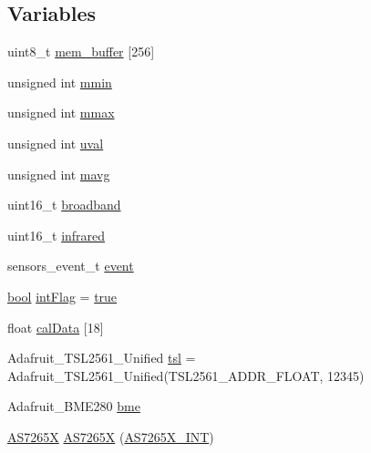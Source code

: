 \subsection*{Variables}
\begin{DoxyCompactItemize}
\item 
uint8\-\_\-t \hyperlink{OWP__DG__SensorStation_8ino_a02235b4e96743403348a58d554caa3dc}{mem\-\_\-buffer} \mbox{[}256\mbox{]}
\item 
unsigned int \hyperlink{OWP__DG__SensorStation_8ino_a46d2773d075382821ba5cc9724036ef6}{mmin}
\item 
unsigned int \hyperlink{OWP__DG__SensorStation_8ino_ac3c625f389082ca7f017934b3508462d}{mmax}
\item 
unsigned int \hyperlink{OWP__DG__SensorStation_8ino_a9d70bb475aa8f1e2306b0aa86b444763}{uval}
\item 
unsigned int \hyperlink{OWP__DG__SensorStation_8ino_ad54903c3e759902a4089ee088aedb4a6}{mavg}
\item 
uint16\-\_\-t \hyperlink{OWP__DG__SensorStation_8ino_aaa5c7d0bf3e3db372c321ee38a514a57}{broadband}
\item 
uint16\-\_\-t \hyperlink{OWP__DG__SensorStation_8ino_a5677d0b4405dd192091db97a8941dbc8}{infrared}
\item 
sensors\-\_\-event\-\_\-t \hyperlink{OWP__DG__SensorStation_8ino_a40ecda65c4ebce49fa139666f210bef0}{event}
\item 
\hyperlink{stdbool_8h_abb452686968e48b67397da5f97445f5b}{bool} \hyperlink{OWP__DG__SensorStation_8ino_a7b074219f5f6b80d857f46161612384a}{int\-Flag} = \hyperlink{stdbool_8h_a41f9c5fb8b08eb5dc3edce4dcb37fee7}{true}
\item 
float \hyperlink{OWP__DG__SensorStation_8ino_aff70aaa7c9c08aa0348aabb883ab7cf6}{cal\-Data} \mbox{[}18\mbox{]}
\item 
Adafruit\-\_\-\-T\-S\-L2561\-\_\-\-Unified \hyperlink{OWP__DG__SensorStation_8ino_a34dc1ffbb166b7afbf402f717b871f77}{tsl} = Adafruit\-\_\-\-T\-S\-L2561\-\_\-\-Unified(T\-S\-L2561\-\_\-\-A\-D\-D\-R\-\_\-\-F\-L\-O\-A\-T, 12345)
\item 
Adafruit\-\_\-\-B\-M\-E280 \hyperlink{OWP__DG__SensorStation_8ino_a2871708605796e3f6cfa9cd9328daff3}{bme}
\item 
\hyperlink{classAS7265X}{A\-S7265\-X} \hyperlink{OWP__DG__SensorStation_8ino_a50195f69c65c262ccef16d7230da9945}{A\-S7265\-X} (\hyperlink{OWP__DG__SensorStation_8ino_a769364352155d64fe2171026cb0d0714}{A\-S7265\-X\-\_\-\-I\-N\-T})
\end{DoxyCompactItemize}


